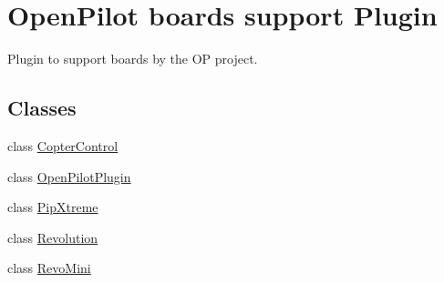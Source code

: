 \hypertarget{group___boards___open_pilot_plugin}{\section{Open\-Pilot boards support Plugin}
\label{group___boards___open_pilot_plugin}
}


Plugin to support boards by the O\-P project.  


\subsection*{Classes}
\begin{DoxyCompactItemize}
\item 
class \hyperlink{class_copter_control}{Copter\-Control}
\item 
class \hyperlink{class_open_pilot_plugin}{Open\-Pilot\-Plugin}
\item 
class \hyperlink{class_pip_xtreme}{Pip\-Xtreme}
\item 
class \hyperlink{class_revolution}{Revolution}
\item 
class \hyperlink{class_revo_mini}{Revo\-Mini}
\end{DoxyCompactItemize}

